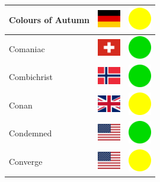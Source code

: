 \documentclass[12pt, a4paper, twoside]{report}
\begin{document}
\begin{center}
\begin{longtable}{|p{5cm}|p{2cm}|p{2cm}|}
Colours of Autumn & \includegraphics[width=1cm]{4x3/de} & \includegraphics[width=1cm]{likes/m} \\ \hline
Comaniac & \includegraphics[width=1cm]{4x3/ch} & \includegraphics[width=1cm]{likes/y} \\ \hline
Combichrist & \includegraphics[width=1cm]{4x3/no} & \includegraphics[width=1cm]{likes/y} \\ \hline
Conan & \includegraphics[width=1cm]{4x3/gb} & \includegraphics[width=1cm]{likes/m} \\ \hline
Condemned & \includegraphics[width=1cm]{4x3/us} & \includegraphics[width=1cm]{likes/y} \\ \hline
Converge & \includegraphics[width=1cm]{4x3/us} & \includegraphics[width=1cm]{likes/m} \\ \hline

\end{longtable}
\end{center}
\end{document}
